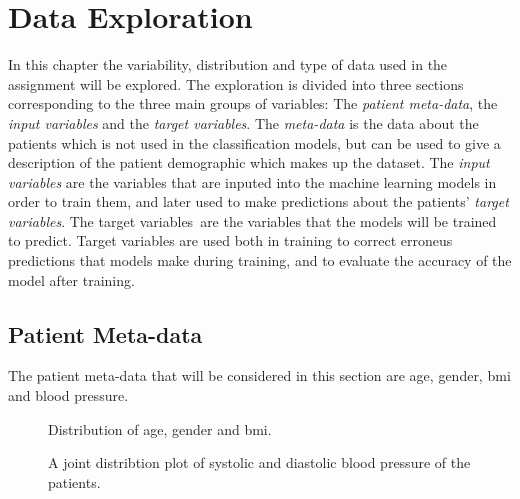 \chapter{Data Exploration} \label{chap:data}

In this chapter the variability, distribution and type of data used in the assignment will be explored. The exploration is divided into three sections corresponding to the three main groups of variables: The \textit{patient meta-data}, the \textit{input variables} and the \textit{target variables}. The \textit{meta-data} is the data about the patients which is not used in the classification models, but can be used to give a description of the patient demographic which makes up the dataset. The \textit{input variables} are the variables that are inputed into the machine learning models in order to train them, and later used to make predictions about the patients' \textit{target variables}. The target variables are the variables that the models will be trained to predict. Target variables are used both in training to correct erroneus predictions that models make during training, and to evaluate the accuracy of the model after training. \bigskip

\section{Patient Meta-data} \label{sec:metadata}
The patient meta-data that will be considered in this section are age, gender, \acrfull{bmi} and blood pressure.

\begin{figure}
    \centering
    
    \caption{Distribution of age, gender and \acrshort{bmi}.}
    \label{fig:meta_dist4}
\end{figure}

\begin{figure}
    \centering
    
    \caption{A joint distribtion plot of systolic and diastolic blood pressure of the patients.}
    \label{fig:bp_dist}
\end{figure}

